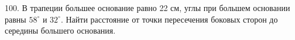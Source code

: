 100. В трапеции большее основание равно 22 см, углы при большем основании равны $58^\circ$ и $32^\circ.$ Найти расстояние от точки пересечения боковых сторон до середины большего основания.\\
